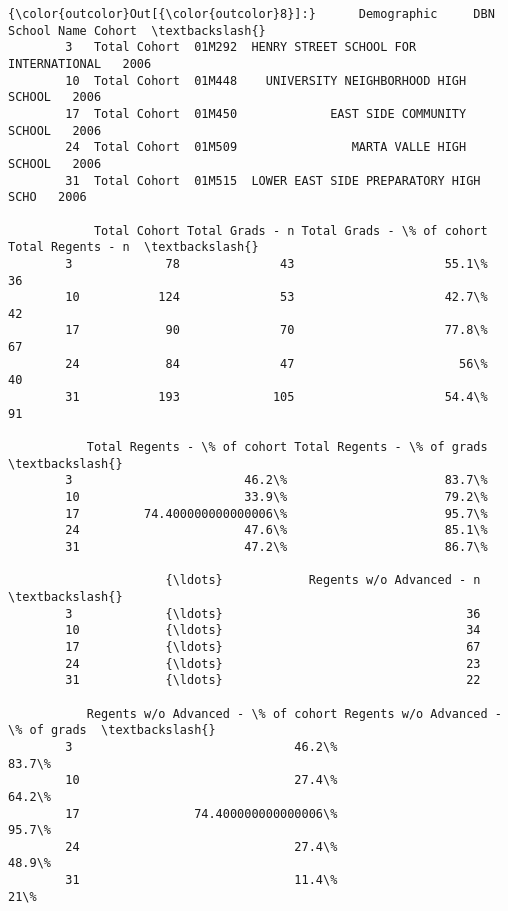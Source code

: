 \documentclass[11pt]{article}
\begin{document}
\begin{Verbatim}[commandchars=\\\{\}]
{\color{outcolor}Out[{\color{outcolor}8}]:}      Demographic     DBN                            School Name Cohort  \textbackslash{}
        3   Total Cohort  01M292  HENRY STREET SCHOOL FOR INTERNATIONAL   2006   
        10  Total Cohort  01M448    UNIVERSITY NEIGHBORHOOD HIGH SCHOOL   2006   
        17  Total Cohort  01M450             EAST SIDE COMMUNITY SCHOOL   2006   
        24  Total Cohort  01M509                MARTA VALLE HIGH SCHOOL   2006   
        31  Total Cohort  01M515  LOWER EAST SIDE PREPARATORY HIGH SCHO   2006   
        
            Total Cohort Total Grads - n Total Grads - \% of cohort Total Regents - n  \textbackslash{}
        3             78              43                     55.1\%                36   
        10           124              53                     42.7\%                42   
        17            90              70                     77.8\%                67   
        24            84              47                       56\%                40   
        31           193             105                     54.4\%                91   
        
           Total Regents - \% of cohort Total Regents - \% of grads  \textbackslash{}
        3                        46.2\%                      83.7\%   
        10                       33.9\%                      79.2\%   
        17         74.400000000000006\%                      95.7\%   
        24                       47.6\%                      85.1\%   
        31                       47.2\%                      86.7\%   
        
                      {\ldots}            Regents w/o Advanced - n  \textbackslash{}
        3             {\ldots}                                  36   
        10            {\ldots}                                  34   
        17            {\ldots}                                  67   
        24            {\ldots}                                  23   
        31            {\ldots}                                  22   
        
           Regents w/o Advanced - \% of cohort Regents w/o Advanced - \% of grads  \textbackslash{}
        3                               46.2\%                             83.7\%   
        10                              27.4\%                             64.2\%   
        17                74.400000000000006\%                             95.7\%   
        24                              27.4\%                             48.9\%   
        31                              11.4\%                               21\%   
        

\end{Verbatim}
\end{document}
